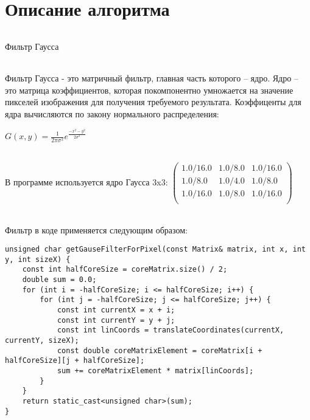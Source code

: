 \documentclass[12pt,a4paper]{article}
\begin{document}
\part*{Описание алгоритма}
\paragraph{}{\large Фильтр Гаусса}
\paragraph{}Фильтр Гаусса - это матричный фильтр, главная часть которого – ядро. Ядро – это матрица коэффициентов, которая покомпонентно умножается на значение пикселей
изображения для получения требуемого результата. Коэффиценты для ядра вычисляются по закону нормального распределения:\\ 
 \begin{center}
{\LARGE $G(x, y) = \frac{1}{2\pi \sigma^2} e ^ {\frac{-x^2 -y^2}{2\sigma^2}}$}\\
 \end{center}
\paragraph{}В программе используется ядро Гаусса 3x3:  
$\begin{pmatrix}
1.0 / 16.0 & 1.0 / 8.0 & 1.0 / 16.0\\
1.0 / 8.0 & 1.0 / 4.0 & 1.0 / 8.0\\
1.0 / 16.0 & 1.0 / 8.0 & 1.0 / 16.0\\
\end{pmatrix}$\\
\paragraph{}Фильтр в коде применяется следующим образом:
\begin{lstlisting}
unsigned char getGauseFilterForPixel(const Matrix& matrix, int x, int y, int sizeX) {
    const int halfCoreSize = coreMatrix.size() / 2;
    double sum = 0.0;
    for (int i = -halfCoreSize; i <= halfCoreSize; i++) {
        for (int j = -halfCoreSize; j <= halfCoreSize; j++) {
            const int currentX = x + i;
            const int currentY = y + j;
            const int linCoords = translateCoordinates(currentX, currentY, sizeX);
            const double coreMatrixElement = coreMatrix[i + halfCoreSize][j + halfCoreSize];
            sum += coreMatrixElement * matrix[linCoords];
        }
    }
    return static_cast<unsigned char>(sum);
}
\end{lstlisting}
\end{document}
